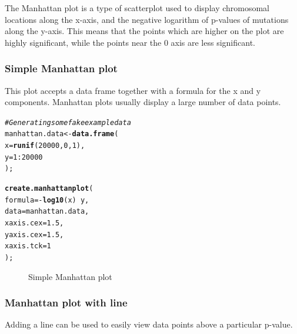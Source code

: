 \documentclass[letterpaper]{article}\usepackage[]{graphicx}\usepackage[]{color}
\makeatletter
\newcommand{\hlnum}[1]{\textcolor[rgb]{0.686,0.059,0.569}{#1}}%
\newcommand{\hlcom}[1]{\textcolor[rgb]{0.678,0.584,0.686}{\textit{#1}}}%
\newcommand{\hlopt}[1]{\textcolor[rgb]{0,0,0}{#1}}%
\newcommand{\hlstd}[1]{\textcolor[rgb]{0.345,0.345,0.345}{#1}}%
\newcommand{\hlkwb}[1]{\textcolor[rgb]{0.69,0.353,0.396}{#1}}%
\newcommand{\hlkwc}[1]{\textcolor[rgb]{0.333,0.667,0.333}{#1}}%
\newcommand{\hlkwd}[1]{\textcolor[rgb]{0.737,0.353,0.396}{\textbf{#1}}}%
\newenvironment{kframe}{%
 \def\at@end@of@kframe{}%
 \ifinner\ifhmode%
  \def\at@end@of@kframe{\end{minipage}}%
  \begin{minipage}{\columnwidth}%
 \fi\fi%
 \def\FrameCommand##1{\hskip\@totalleftmargin \hskip-\fboxsep
 \colorbox{shadecolor}{##1}\hskip-\fboxsep
     \hskip-\linewidth \hskip-\@totalleftmargin \hskip\columnwidth}%
 \MakeFramed {\advance\hsize-\width
   \@totalleftmargin\z@ \linewidth\hsize
   \@setminipage}}%
 {\par\unskip\endMakeFramed%
 \at@end@of@kframe}
\newenvironment{knitrout}{}{} %
\makeatother
\begin{document}
The Manhattan plot is a type of scatterplot used to display chromosomal locations along the x-axis, and the negative logarithm of p-values of mutations along the y-axis. This means that the points which are higher on the plot are highly significant, while the points near the 0 axis are less significant.

\subsubsection{Simple Manhattan plot}
This plot accepts a data frame together with a formula for the x and y components. Manhattan plots usually display a large number of data points.

\begin{knitrout}
\color{fgcolor}\begin{kframe}
\begin{alltt}
\hlcom{# Generating some fake example data}
\hlstd{manhattan.data} \hlkwb{<-} \hlkwd{data.frame}\hlstd{(}
    \hlkwc{x} \hlstd{=} \hlkwd{runif}\hlstd{(}\hlnum{20000}\hlstd{,} \hlnum{0}\hlstd{,} \hlnum{1}\hlstd{),}
    \hlkwc{y} \hlstd{=} \hlnum{1}\hlopt{:}\hlnum{20000}
    \hlstd{);}

\hlkwd{create.manhattanplot}\hlstd{(}
    \hlkwc{formula} \hlstd{=} \hlopt{-}\hlkwd{log10}\hlstd{(x)} \hlopt{~} \hlstd{y,}
    \hlkwc{data} \hlstd{= manhattan.data,}
    \hlkwc{xaxis.cex} \hlstd{=} \hlnum{1.5}\hlstd{,}
    \hlkwc{yaxis.cex} \hlstd{=} \hlnum{1.5}     \hlstd{,}
    \hlkwc{xaxis.tck} \hlstd{=} \hlnum{1}
    \hlstd{);}
\end{alltt}
\end{kframe}\begin{figure}[]


{\centering {} 

}

\caption[Simple Manhattan plot]{Simple Manhattan plot\label{fig:manhattan1}}
\end{figure}


\end{knitrout}

\subsubsection{Manhattan plot with line}
Adding a line can be used to easily view data points above a particular p-value.
\end{document}
